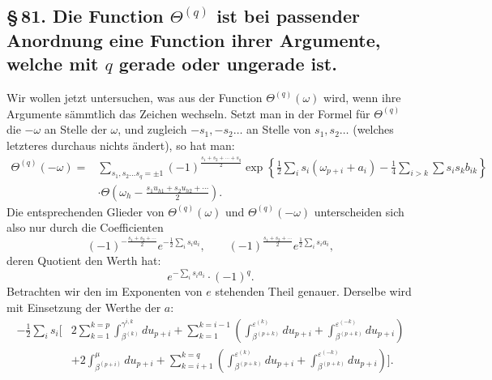 \documentclass[10pt]{article}
\begin{document}

\subsection*{\S\,81. Die Function \(\Theta^{(q)}\) ist bei passender Anordnung eine Function ihrer Argumente, welche mit \(q\) gerade oder ungerade ist.}

Wir wollen jetzt untersuchen, was aus der Function \(\Theta^{(q)}(\omega)\) wird, wenn ihre Argumente sämmtlich das Zeichen wechseln. Setzt man in der Formel für \(\Theta^{(q)}\) die \(-\omega\) an Stelle der \(\omega\), und zugleich \(-s_1,-s_2\ldots\) an Stelle von \(s_1,s_2\ldots\) (welches letzteres durchaus nichts ändert), so hat man:
\[
\begin{aligned}
\Theta^{(q)}(-\omega)={}&
\sum_{s_1,s_2\ldots s_q=\pm1}(-1)^{\frac{s_1+s_2+\cdots+s_q}{2}}
\exp\!\left
\{\frac12\sum_i s_i(\omega_{p+i}+a_i)-\frac14\sum_{i>k}\sum s_i s_k b_{ik}\right\}\\
&\cdot \Theta\!\left(\omega_h-\frac{s_1u_{h1}+s_2u_{h2}+\cdots}{2}\right).
\end{aligned}
\]
Die entsprechenden Glieder von \(\Theta^{(q)}(\omega)\) und \(\Theta^{(q)}(-\omega)\) unterscheiden sich also nur durch die Coefficienten
\[
(-1)^{-\frac{s_1+s_2+\cdots}{2}}e^{-\frac12\sum_i s_ia_i},\qquad
(-1)^{\frac{s_1+s_2+\cdots}{2}}e^{\frac12\sum_i s_ia_i},
\]
deren Quotient den Werth hat:
\[
e^{-\sum_i s_i a_i}\cdot(-1)^q.
\]
Betrachten wir den im Exponenten von \(e\) stehenden Theil genauer. Derselbe wird mit Einsetzung der Werthe der \(a\):
\[
\begin{aligned}
-\frac12\sum_i s_i\Bigg[
&2\sum_{k=1}^{k=p}\int_{\beta^{(k)}}^{\gamma^{i,k}}du_{p+i}
+\sum_{k=1}^{k=i-1}\left(\int_{\beta^{(p+k)}}^{\varepsilon^{(k)}}du_{p+i}
+\int_{\beta^{(p+k)}}^{\varepsilon^{(-k)}}du_{p+i}\right)\\
&+2\int_{\beta^{(p+i)}}^{\mu}du_{p+i}
+\sum_{k=i+1}^{k=q}\left(\int_{\beta^{(p+k)}}^{\varepsilon^{(k)}}du_{p+i}
+\int_{\beta^{(p+k)}}^{\varepsilon^{(-k)}}du_{p+i}\right)
\Bigg].
\end{aligned}
\]
\end{document}
